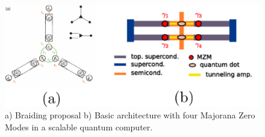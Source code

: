 \begin{figure}[H]
  \centering
  \includegraphics[scale=1]{IMAGES/Majorana/Prospective.png}
  \caption{\label{fig:braid} a) Braiding proposal b) Basic architecture with four Majorana Zero Modes in a scalable quantum computer.\protect{}}
\end{figure}

















